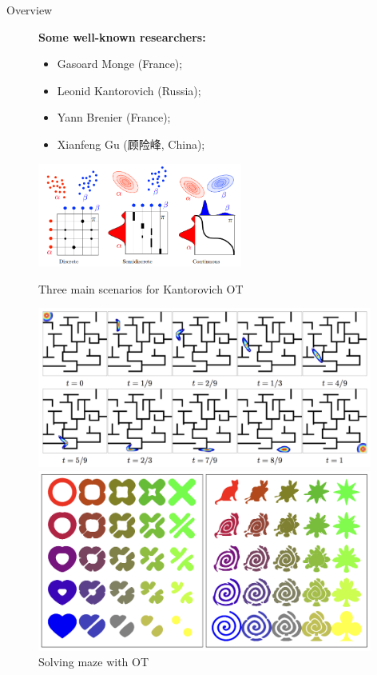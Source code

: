 \begin{frame}{Overview}
\begin{figure}
\begin{minipage}[t]{0.6\linewidth}
            \textbf{Some well-known researchers:}
            \begin{itemize}
                \item Gasoard Monge (France);
                \item Leonid Kantorovich (Russia);
                \item Yann Brenier (France);
                \item Xianfeng Gu (顾险峰, China);
            \end{itemize}
            \centering
            \includegraphics[width=0.6\textwidth]{png/3TypesOfOT.png}
            \vspace{-.7em}
            \caption{Three main scenarios for Kantorovich OT}
        \end{minipage}
        \begin{minipage}[t]{0.38\linewidth}
            \vspace{0pt}
            \centering
            \includegraphics[width=0.98\textwidth]{png/maze.png}
            \caption{Solving maze with OT}
            \includegraphics[width=0.98\textwidth]{png/2DShapeInterpolation.png}

\end{minipage}
\end{figure}
\end{frame}
